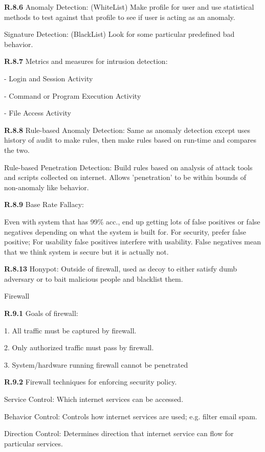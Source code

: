 \documentclass[8pt]{extreport}
\begin{document}

{\bf R.8.6}
Anomaly Detection: (WhiteList) Make profile for user and use statistical methods to test
against that profile to see if user is acting as an anomaly.

Signature Detection: (BlackList) Look for some particular predefined bad
behavior.

{\bf R.8.7}
Metrics and measures for intrusion detection:

- Login and Session Activity

- Command or Program Execution Activity

- File Access Activity

{\bf R.8.8}
Rule-based Anomaly Detection: Same as anomaly detection except uses history of
audit to make rules, then make rules based on run-time and compares the two.

Rule-based Penetration Detection: Build rules based on analysis of attack tools
and scripts collected on internet. Allows 'penetration' to be within bounds of
non-anomaly like behavior.

{\bf R.8.9} Base Rate Fallacy:

Even with system that has 99\% acc., end up getting lots of false positives or
false negatives depending on what the system is built for. For security, prefer
false positive; For usability false positives interfere with usability. False
negatives mean that we think system is secure but it is actually not.

{\bf R.8.13}
Honypot: Outside of firewall, used as decoy to either satisfy dumb adversary or
to bait malicious people and blacklist them.



{\Huge Firewall}

{\bf R.9.1}
Goals of firewall:

1. All traffic must be captured by firewall.

2. Only authorized traffic must pass by firewall.

3. System/hardware running firewall cannot be penetrated

{\bf R.9.2}
Firewall techniques for enforcing security policy.

Service Control: Which internet services can be accessed.

Behavior Control: Controls how internet services are used; e.g. filter email spam.

Direction Control: Determines direction that internet service can flow for
particular services.
\end{document}
